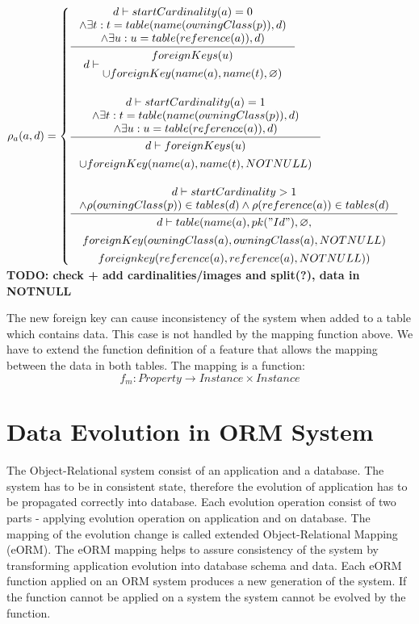 \documentclass[11pt]{article}
\begin{document}
$
\rho_a(a,d) = \begin{cases}
 \inference{d \vdash startCardinality(a) = 0 \\ \wedge \exists t : t = table(name(owningClass(p)), d) \\ \wedge \exists u : u = table(reference(a)), d)}{d \vdash 
 \begin{gathered}
 foreignKeys(u) \\ \cup foreignKey(name(a), name(t),  \varnothing) 
 \end{gathered}
 }
  \\ \\
 \inference{d \vdash startCardinality(a) = 1 \\ \wedge \exists t : t = table(name(owningClass(p)), d) \\ \wedge \exists u : u = table(reference(a)), d)}{\begin{gathered} d \vdash 
foreignKeys(u) \\ \cup  foreignKey(name(a), name(t),  NOTNULL) \\
\end{gathered}
} \\ \\
 
  \inference{d \vdash  startCardinality > 1 \\ \wedge \rho(owningClass(p)) \in tables(d) \wedge \rho(reference(a)) \in tables(d)}{
  \begin{gathered} d \vdash 
 table(name(a), pk("Id"), \varnothing, \\ foreignKey(owningClass(a),owningClass(a), NOTNULL) \\ foreignkey(reference(a), reference(a), NOTNULL)) 
  \end{gathered}}  
 \end{cases}
$
\textbf{TODO: check + add cardinalities/images and split(?), data in NOTNULL}

The new foreign key can cause inconsistency of the system when added to a table which contains data. This case is not handled by the mapping function above. We have to extend the function definition of a feature that allows the mapping between the data in both tables. The mapping is a function:
$$f_m : Property \rightarrow Instance \times Instance $$




\section{Data Evolution in ORM System}
The Object-Relational system consist of an application and a database. The system has to be in consistent state, therefore the evolution of application has to be propagated correctly into database. Each evolution operation consist of two parts - applying evolution operation on application and on database. The mapping of the evolution change is called extended Object-Relational Mapping (eORM). The eORM mapping helps to assure consistency of the system by transforming application evolution into database schema and data. Each eORM function applied on an ORM system produces a new generation of the system. If the function cannot be applied on a system the system cannot be evolved by the function. 
\end{document}

